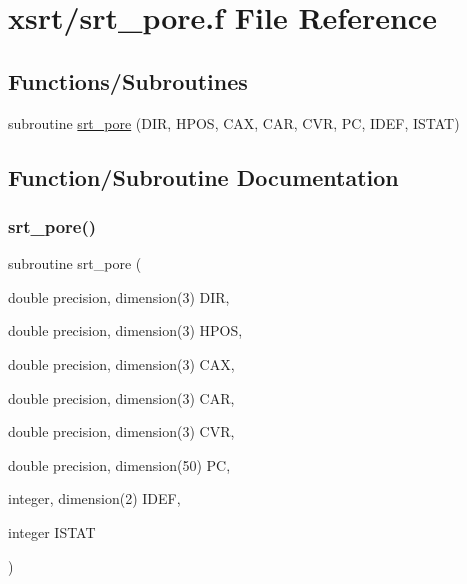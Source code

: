 \hypertarget{srt__pore_8f}{}\section{xsrt/srt\+\_\+pore.f File Reference}
\label{srt__pore_8f}
\subsection*{Functions/\+Subroutines}
\begin{DoxyCompactItemize}
\item 
subroutine \hyperlink{srt__pore_8f_ae37bf82014c11925841351afdce50670}{srt\+\_\+pore} (D\+IR, H\+P\+OS, C\+AX, C\+AR, C\+VR, PC, I\+D\+EF, I\+S\+T\+AT)
\end{DoxyCompactItemize}


\subsection{Function/\+Subroutine Documentation}
\mbox{\label{srt__pore_8f_ae37bf82014c11925841351afdce50670}} 
\subsubsection{\texorpdfstring{srt\+\_\+pore()}{srt\_pore()}}
{\footnotesize\ttfamily subroutine srt\+\_\+pore (\begin{DoxyParamCaption}\item[{double precision, dimension(3)}]{D\+IR,  }\item[{double precision, dimension(3)}]{H\+P\+OS,  }\item[{double precision, dimension(3)}]{C\+AX,  }\item[{double precision, dimension(3)}]{C\+AR,  }\item[{double precision, dimension(3)}]{C\+VR,  }\item[{double precision, dimension(50)}]{PC,  }\item[{integer, dimension(2)}]{I\+D\+EF,  }\item[{integer}]{I\+S\+T\+AT }\end{DoxyParamCaption})}


